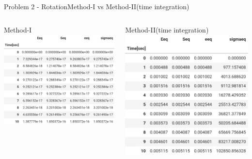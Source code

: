 \documentclass{beamer}
\begin{document}
\begin{frame}{Problem 2 - Rotation}{Method-I vs Method-II(time integration)}
    \vspace{-2em}
    \begin{columns}
        \begin{block}{\footnotesize Method-I}
            \includegraphics[width=\textwidth]{Values/m2t2.png}
        \end{block}
        \begin{block}{\footnotesize Method-II(time integration)}
            \includegraphics[width=\textwidth]{Values/m1t2.png}
        \end{block}
    \end{columns}
\end{frame}
\end{document}
